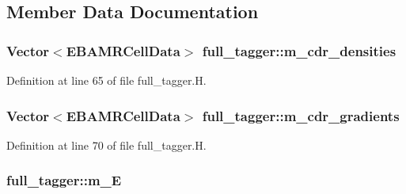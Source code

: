 \subsection{Member Data Documentation}
\subsubsection[{\texorpdfstring{m\+\_\+cdr\+\_\+densities}{m_cdr_densities}}]{\setlength{\rightskip}{0pt plus 5cm}Vector$<${\bf E\+B\+A\+M\+R\+Cell\+Data}$>$ full\+\_\+tagger\+::m\+\_\+cdr\+\_\+densities\hspace{0.3cm}{\ttfamily [protected]}}\hypertarget{classfull__tagger_a0312392573aad822051b27c8aac92acf}{}\label{classfull__tagger_a0312392573aad822051b27c8aac92acf}


Definition at line 65 of file full\+\_\+tagger.\+H.

\subsubsection[{\texorpdfstring{m\+\_\+cdr\+\_\+gradients}{m_cdr_gradients}}]{\setlength{\rightskip}{0pt plus 5cm}Vector$<${\bf E\+B\+A\+M\+R\+Cell\+Data}$>$ full\+\_\+tagger\+::m\+\_\+cdr\+\_\+gradients\hspace{0.3cm}{\ttfamily [protected]}}\hypertarget{classfull__tagger_a3ad6b7bdf7e5fe06259e889084c7ee10}{}\label{classfull__tagger_a3ad6b7bdf7e5fe06259e889084c7ee10}


Definition at line 70 of file full\+\_\+tagger.\+H.

\subsubsection[{\texorpdfstring{m\+\_\+E}{m_E}}]{ full\+\_\+tagger\+::m\+\_\+E\hspace{0.3cm}{\ttfamily [protected]}}\hypertarget{classfull__tagger_a2dfbab8e9cb17d3f8319ac669612f30e}{}\label{classfull__tagger_a2dfbab8e9cb17d3f8319ac669612f30e}


